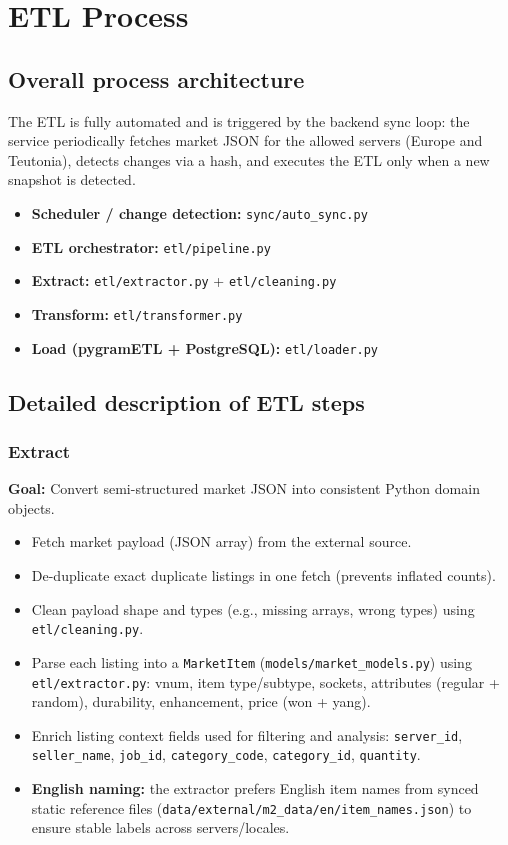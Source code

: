 \chapter{ETL Process}

\section{Overall process architecture}
The ETL is fully automated and is triggered by the backend sync loop:
the service periodically fetches market JSON for the allowed servers (Europe and Teutonia), detects changes via a hash, and executes the ETL only when a new snapshot is detected.

\begin{itemize}
  \item \textbf{Scheduler / change detection:} \texttt{sync/auto\_sync.py}
  \item \textbf{ETL orchestrator:} \texttt{etl/pipeline.py}
  \item \textbf{Extract:} \texttt{etl/extractor.py} + \texttt{etl/cleaning.py}
  \item \textbf{Transform:} \texttt{etl/transformer.py}
  \item \textbf{Load (pygramETL + PostgreSQL):} \texttt{etl/loader.py}
\end{itemize}


\section{Detailed description of ETL steps}
\subsection{Extract}
\textbf{Goal:} Convert semi-structured market JSON into consistent Python domain objects.
\begin{itemize}
  \item Fetch market payload (JSON array) from the external source.
  \item De-duplicate exact duplicate listings in one fetch (prevents inflated counts).
  \item Clean payload shape and types (e.g., missing arrays, wrong types) using \texttt{etl/cleaning.py}.
  \item Parse each listing into a \texttt{MarketItem} (\texttt{models/market\_models.py}) using \texttt{etl/extractor.py}:
  vnum, item type/subtype, sockets, attributes (regular + random), durability, enhancement, price (won + yang).
  \item Enrich listing context fields used for filtering and analysis:
  	\texttt{server\_id}, \texttt{seller\_name}, \texttt{job\_id}, \texttt{category\_code}, \texttt{category\_id}, \texttt{quantity}.
  \item \textbf{English naming:} the extractor prefers English item names from synced static reference files
  (\texttt{data/external/m2\_data/en/item\_names.json}) to ensure stable labels across servers/locales.
\end{itemize}

